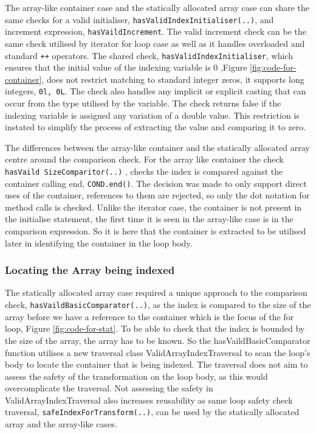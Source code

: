 \documentclass[bsc,frontabs,singlespacing,twoside,parskip,deptreport]{infthesis}
\begin{document}
The array-like container case and the statically allocated array case can share the same checks for a valid initialiser, \texttt{hasValidIndexInitialiser(..)}, and increment expression, \texttt{hasVaildIncrement}. The valid increment check can be the same check utilised by iterator for loop case as well as it handles overloaded and standard \texttt{++} operators. The shared check, \texttt{hasValidIndexInitialiser}, which ensures that the initial value of the indexing variable is 0 ,Figure \ref{fig:code-for-container},  does not restrict matching to standard integer zeros, it supports long integers, \texttt{0l, 0L}. The check also handles any implicit or explicit casting that can occur from the type utilised by the variable. The check returns false if the indexing variable is assigned any variation of a double value. This restriction is instated to simplify the process of extracting the value and comparing it to zero.


The differences between the array-like container and the statically allocated array centre around the comparison check. For the array like container the check \texttt{hasVaild SizeComparitor(..)} , checks the index is compared against the container calling end, \texttt{COND.end()}. The decision was made to only support direct uses of the container, references to them are rejected, so only the dot notation for method calls is checked. Unlike the iterator case, the container is not present in the initialise statement, the first time it is seen in the array-like case is in the comparison expression. So it is here that the container is extracted to be utilised later in identifying the container in the loop body.

\subsubsection{Locating the Array being indexed}

The statically allocated array case required a unique approach to the comparison check, \texttt{hasVaildBasicComparator(..)}, as the index is compared to the size of the array before we have a reference to the container which is the focus of the for loop, Figure \ref{fig:code-for-stat}. To be able to check that the index is bounded by the size of the array, the array has to be known. So the hasVaildBasicComparator function utilises a new traversal class ValidArrayIndexTraversal to scan the loop's body to locate the container that is being indexed. The traversal does not aim to assess the safety of the transformation on the loop body, as this would overcomplicate the traversal. Not assessing the safety in ValidArrayIndexTraversal also increases reusability as same loop safety check traversal, \texttt{safeIndexForTransform(..)}, can be used by the statically allocated array and the array-like cases. 
\end{document}
